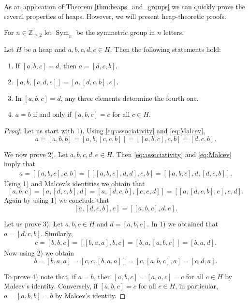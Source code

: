 \documentclass[graybox]{svmult}
\newcommand{\Z}{\mathbb{Z}}
\newcommand{\Sym}{\operatorname{Sym}}
\begin{document}
As an application of Theorem \ref{thm:heaps_and_groups} we can quickly prove
the several properties of heaps. However, we will 
present heap-theoretic proofs. 

For $n\in\Z_{\geq2}$ let 
$\Sym_n$ be the symmetric group in $n$ letters. 

\begin{theorem}
\label{thm:properties}
Let $H$ be a heap and $a,b,c,d,e\in H$. Then the following statements hold:
\begin{enumerate}
    \item If $[a,b,c]=d$, then $a=[d,c,b]$. 
    \item $[a,b,[c,d,e]]=[a,[d,c,b],e]$.
    \item In $[a,b,c]=d$, any three elements determine the fourth one. 
    \item $a=b$ if and only 
        if $[a,b,c]=c$ for all $c\in H$. 
\end{enumerate}
\end{theorem}

\begin{proof}
Let us start with 1). Using \eqref{eq:associativity} and \eqref{eq:Malcev}, 
\[
a=[a,b,b]=[a,b,[c,c,b]]=[[a,b,c],c,b]=[d,c,b].
\]

We now prove 2). Let $a,b,c,d,e\in H$. Then \eqref{eq:associativity} and \eqref{eq:Malcev} imply that
\begin{align*}
    a=[[a,b,c],c,b]=\left[[[a,b,c],d,d],c,b\right]=\left[[a,b,c],d,[d,c,b]\right].
\end{align*}
Using 1) and Malcev's identities we obtain that
\[
[a,b,c]=\left[a,[d,c,b],d\right]=\left[a,[d,c,b],[e,e,d]\right]=\left[[a,[d,c,b],e],e,d\right].
\]
Again by using 1) we conclude that
\[
[a,[d,c,b],e]=\left[[a,b,c],d,e\right].
\]


Let us prove 3). Let $a,b,c\in H$ and $d=[a,b,c]$. In 1) 
we obtained that $a=[d,c,b]$. Similarly,  
\begin{align*}
\label{eq:Iknow3}
c=[b,b,c]=[[b,a,a],b,c]=[b,a,[a,b,c]]=[b,a,d].
\end{align*}
Now using 2) we obtain
\[
b=[b,a,a]=[c,c,[b,a,a]]=[c,[a,b,c],a]=[c,d,a].
\]

To prove 4) note that, if $a=b$, then $[a,b,c]=[a,a,c]=c$ for all $c\in H$ 
by Malcev's identity. Conversely,
if $[a,b,c]=c$ for all $c\in H$, in particular, $a=[a,b,b]=b$ by Malcev's identity. 
\end{proof}
\end{document}
